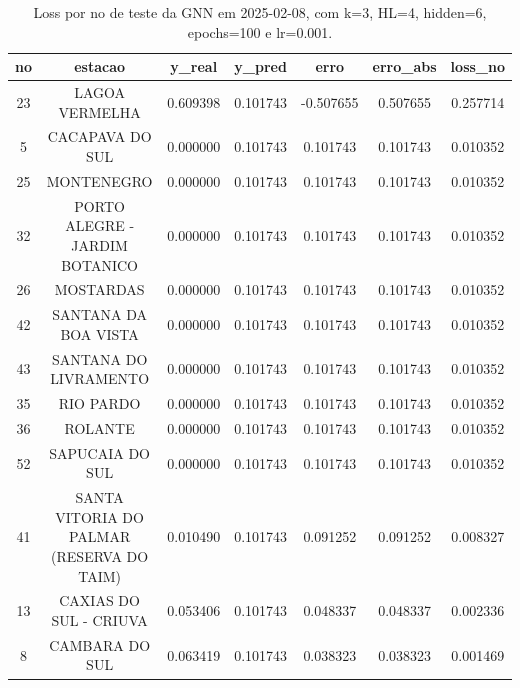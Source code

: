 \begin{table}[h]
\centering
\caption{Loss por no de teste da GNN em 2025-02-08, com k=3, HL=4, hidden=6, epochs=100 e lr=0.001.}
\label{tab:gnn_loss_k3_hl4_h6_e100_d20250208}
\begin{tabular}{ccccccc}
\toprule
no & estacao & y\_real & y\_pred & erro & erro\_abs & loss\_no \\
\midrule
23 & LAGOA VERMELHA & 0.609398 & 0.101743 & -0.507655 & 0.507655 & 0.257714 \\
5 & CACAPAVA DO SUL & 0.000000 & 0.101743 & 0.101743 & 0.101743 & 0.010352 \\
25 & MONTENEGRO & 0.000000 & 0.101743 & 0.101743 & 0.101743 & 0.010352 \\
32 & PORTO ALEGRE - JARDIM BOTANICO & 0.000000 & 0.101743 & 0.101743 & 0.101743 & 0.010352 \\
26 & MOSTARDAS & 0.000000 & 0.101743 & 0.101743 & 0.101743 & 0.010352 \\
42 & SANTANA DA BOA VISTA & 0.000000 & 0.101743 & 0.101743 & 0.101743 & 0.010352 \\
43 & SANTANA DO LIVRAMENTO & 0.000000 & 0.101743 & 0.101743 & 0.101743 & 0.010352 \\
35 & RIO PARDO & 0.000000 & 0.101743 & 0.101743 & 0.101743 & 0.010352 \\
36 & ROLANTE & 0.000000 & 0.101743 & 0.101743 & 0.101743 & 0.010352 \\
52 & SAPUCAIA DO SUL & 0.000000 & 0.101743 & 0.101743 & 0.101743 & 0.010352 \\
41 & SANTA VITORIA DO PALMAR (RESERVA DO TAIM) & 0.010490 & 0.101743 & 0.091252 & 0.091252 & 0.008327 \\
13 & CAXIAS DO SUL - CRIUVA & 0.053406 & 0.101743 & 0.048337 & 0.048337 & 0.002336 \\
8 & CAMBARA DO SUL & 0.063419 & 0.101743 & 0.038323 & 0.038323 & 0.001469 \\
\bottomrule
\end{tabular}
\end{table}
